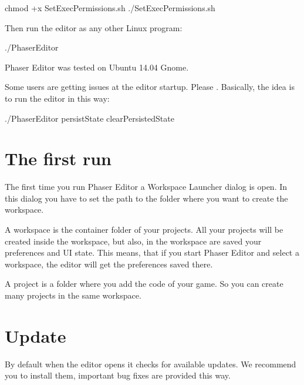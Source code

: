 \documentclass[letterpaper,10pt,english]{sphinxmanual}
\begin{document}
\begin{sphinxVerbatim}[commandchars=\\\{\}]
\PYGZdl{}  
\PYGZdl{} chmod +x SetExecPermissions.sh
\PYGZdl{} ./SetExecPermissions.sh
\end{sphinxVerbatim}

Then run the editor as any other Linux program:

\begin{sphinxVerbatim}[commandchars=\\\{\}]
\PYGZdl{} ./PhaserEditor
\end{sphinxVerbatim}

Phaser Editor was tested on Ubuntu 14.04 Gnome.

Some users are getting issues at the editor startup. Please . Basically, the idea is to run the editor in this way:

\begin{sphinxVerbatim}[commandchars=\\\{\}]
\PYGZdl{} ./PhaserEditor \PYGZhy{}persistState  \PYGZhy{}clearPersistedState
\end{sphinxVerbatim}


\section{The first run}
\label{\detokenize{first_steps:the-first-run}}
The first time you run Phaser Editor a Workspace Launcher dialog is open. In this dialog you have to set the path to the folder where you want to create the workspace.

A workspace is the container folder of your projects. All your projects will be created inside the workspace, but also, in the workspace are saved your preferences and UI state. This means, that if you start Phaser Editor and select a workspace, the editor will get the preferences saved there.

A project is a folder where you add the code of your game. So you can create many projects in the same workspace.

\noindent{}


\section{Update}
\label{\detokenize{first_steps:update}}
By default when the editor opens it checks for available updates. We recommend you to install them, important bug fixes are provided this way.
\end{document}
